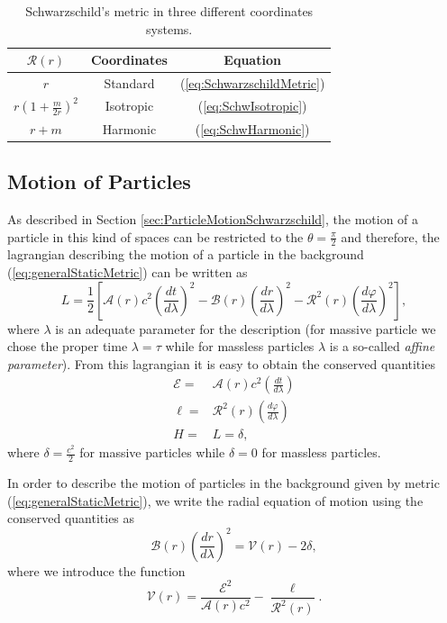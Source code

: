 \begin{table}[h]
\centering
\footnotesize
\begin{tabular}{|c|c|c|}
\hline
$\mathcal{R}(r)$ & Coordinates & Equation \\
\hline
 $r$ & Standard & (\ref{eq:SchwarzschildMetric}) \\
$r\left(1 + \frac{m}{2r} \right)^2$ & Isotropic & (\ref{eq:SchwIsotropic}) \\
$r+m$ & Harmonic & (\ref{eq:SchwHarmonic})\\
\hline
\end{tabular}
\caption{Schwarzschild's metric in three different coordinates systems.}
\label{tab:SchwarzschildForms}
\end{table}

\subsection{Motion of Particles}

As described in Section \ref{sec:ParticleMotionSchwarzschild}, the motion of a particle in this kind of spaces can be restricted to the $\theta = \frac{\pi}{2}$ and therefore, the lagrangian describing the motion of a particle in the background (\ref{eq:generalStaticMetric}) can be written as
\begin{equation}
L = \frac{1}{2} \left[ \mathcal{A}(r) c^2 \left( \frac{dt}{d\lambda} \right)^2 - \mathcal{B}(r) \left( \frac{dr}{d\lambda} \right)^2 - \mathcal{R}^2(r) \left( \frac{d\varphi}{d\lambda} \right)^2 \right],
\end{equation}
where $\lambda$ is an adequate parameter for the description (for massive particle we chose the proper time $\lambda = \tau$ while for massless particles $\lambda$ is a so-called \textit{affine parameter}). From this lagrangian it is easy to obtain the conserved quantities
\begin{subequations} 
\begin{align}
\mathcal{E} = &\mathcal{A}(r) c^2 \left( \frac{dt}{d\lambda} \right) \\
\ell = &  \mathcal{R}^2(r) \left( \frac{d\varphi}{d\lambda} \right) \\
H = &L = \delta,
\end{align}
\end{subequations}
where $\delta = \frac{c^2}{2}$ for massive particles while $\delta = 0$ for massless particles.

In order to describe the motion of particles in the background given by metric (\ref{eq:generalStaticMetric}), we write the radial equation of motion using the conserved quantities as
\begin{equation}
\mathcal{B}(r) \left( \frac{dr}{d\lambda} \right)^2 = \mathcal{V} (r) -2\delta  ,\label{eq:GeneralEoMaux01}
\end{equation}
where we introduce the function
\begin{equation}
\mathcal{V} (r) = \frac{\mathcal{E}^2}{ \mathcal{A}(r) c^2}-\frac{\ell}{\mathcal{R}^2 (r)} . 
\end{equation}

